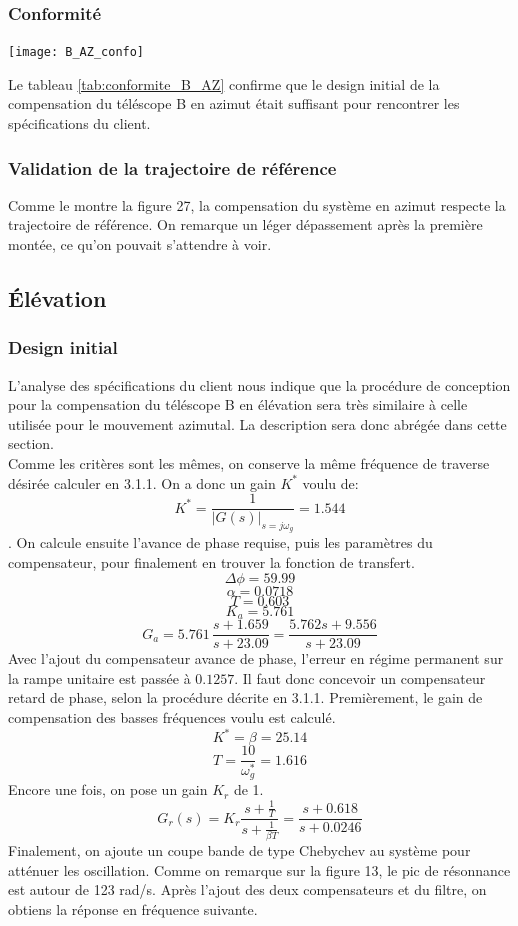\documentclass{udes_rapport} %
\begin{document}
\subsubsection{Conformité}
\begin{center}
  \label{tab:conformite_B_AZ}
  \texttt{[image: B\_AZ\_confo]}
\end{center}

Le tableau \ref{tab:conformite_B_AZ} confirme que le design initial de la compensation du téléscope B en azimut était suffisant pour rencontrer les spécifications du client.
\subsubsection{Validation de la trajectoire de référence}
Comme le montre la figure 27, la compensation du système en azimut respecte la trajectoire de référence. On remarque un léger dépassement après la première montée, ce qu'on pouvait s'attendre à voir.

\subsection{Élévation}
\subsubsection{Design initial}
L'analyse des spécifications du client nous indique que la procédure de conception pour la compensation du téléscope B en élévation sera très similaire à celle utilisée pour le mouvement azimutal. La description sera donc abrégée dans cette section.\\
Comme les critères sont les mêmes, on conserve la même fréquence de traverse désirée calculer en 3.1.1. On a donc un gain $K^*$ voulu de:
\[K^* = \frac{1}{|G(s)|_{s=j\omega_g}} = 1.544\].
On calcule ensuite l'avance de phase requise, puis les paramètres du compensateur, pour finalement en trouver la fonction de transfert. 
\[ \Delta \phi = 59.99\] 
\[\alpha = 0.0718\]
\[ T = 0.603\]
\[ K_a = 5.761\]
\[ G_a = 5.761\,\frac{s+1.659}{s+23.09}=\frac{5.762s+9.556}{s+23.09}\]
Avec l'ajout du compensateur avance de phase, l'erreur en régime permanent sur la rampe unitaire est passée à $0.1257$. Il faut donc concevoir un compensateur retard de phase, selon la procédure décrite en 3.1.1. Premièrement, le gain de compensation des basses fréquences voulu est calculé.
\[K^* = \beta = 25.14\]
\[T = \frac{10}{\omega_g^*} = 1.616 \]
Encore une fois, on pose un gain $K_r$ de 1.
\[ G_r(s)=K_r\frac{s+\frac{1}{T}}{s+\frac{1}{\beta T}} = \frac{s + 0.618}{s + 0.0246} \]
Finalement, on ajoute un coupe bande de type Chebychev au système pour atténuer les oscillation. Comme on remarque sur la figure 13, le pic de résonnance est autour de 123 rad/s. Après l'ajout des deux compensateurs et du filtre, on obtiens la réponse en fréquence suivante.
\end{document}

